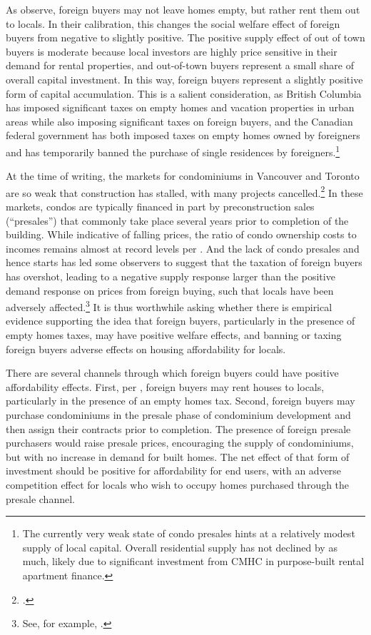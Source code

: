 \documentclass[12pt]{article}
\begin{document}
As \textcite{favilukisVanNieuwerburgh} observe, foreign buyers may not leave
homes empty, but rather rent them out to locals. In their calibration, this
changes the social welfare effect of foreign buyers from negative to slightly
positive. The positive supply effect of out of town buyers is moderate because local investors
are highly price sensitive in their demand for rental properties, and out-of-town
buyers represent a small share of overall capital investment. In this way,
foreign buyers represent a slightly positive form of capital accumulation. This
is a salient consideration, as British Columbia has imposed significant taxes on empty
homes and vacation properties in urban areas while also imposing significant
taxes on foreign buyers, and the Canadian federal government has both imposed
taxes on empty homes owned by foreigners and has temporarily banned the
purchase of single residences by foreigners.\footnote{The currently very weak state of
condo presales hints at a relatively modest supply of local
capital. Overall residential supply has not declined by as much,
likely due to significant investment from CMHC in purpose-built rental
apartment finance.}

At the time of writing, the markets for condominiums in Vancouver and Toronto
are so weak that construction has stalled, with many projects
cancelled.\footnote{\textcite{cmhc2025condominium}.} In these markets, condos
are typically financed in part by preconstruction sales (``presales'') that
commonly take place several years prior to completion of the building. While
indicative of falling prices, the ratio of condo ownership costs to incomes
remains almost at record levels per \textcite{rbc2024housing}. And the lack of
condo presales and hence starts has led some observers to suggest that the
taxation of foreign buyers has overshot, leading to a negative supply response
larger than the positive demand response on prices from foreign buying, such
that locals have been adversely affected.\footnote{See, for example,
\textcite{gold2024foreignbuyers}.} It is thus worthwhile asking whether there
is empirical evidence supporting the idea that foreign buyers, particularly in
the presence of empty homes taxes, may have positive welfare effects, and
banning or taxing foreign buyers adverse effects on housing affordability for
locals.

There are several channels through which foreign buyers could have positive
affordability effects. First, per \textcite{favilukisVanNieuwerburgh}, foreign
buyers may rent houses to locals, particularly in the presence of an empty
homes tax. Second, foreign buyers may purchase condominiums in
the presale phase of condominium development and then assign their contracts
prior to completion. The presence of foreign presale purchasers would raise
presale prices, encouraging the supply of condominiums, but with no increase in
demand for built homes. The net effect of that form of investment should be
positive for affordability for end users, with an adverse competition effect
for locals who wish to occupy homes purchased through the presale channel.
\end{document}
